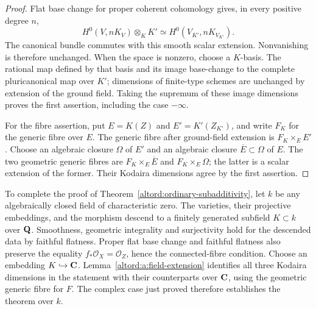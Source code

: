\begin{proof}
Flat base change for proper coherent cohomology gives, in every
positive degree $n$,
\[
 H^0(V,nK_V)\otimes_K K'
 \simeq H^0(V_{K'},nK_{V_{K'}}).
\]
The canonical bundle commutes with this smooth scalar extension.
Nonvanishing is therefore unchanged. When the space is nonzero,
choose a $K$-basis. The rational map defined by that basis and its
image base-change to the complete pluricanonical map over $K'$;
dimensions of finite-type schemes are unchanged by extension of
the ground field. Taking the supremum of these image dimensions
proves the first assertion, including the case $-\infty$.

For the fibre assertion, put \(E=K(Z)\) and
\(E'=K'(Z_{K'})\), and write \(F_K\) for the generic fibre over \(E\).
The generic fibre after ground-field extension is \(F_K\times_E E'\).
Choose an algebraic closure \(\Omega\) of \(E'\) and an algebraic
closure \(\overline E\subset\Omega\) of \(E\). The two geometric
generic fibres are \(F_K\times_E\overline E\) and
\(F_K\times_E\Omega\); the latter is a scalar extension of the
former. Their Kodaira dimensions agree by the first assertion.
\end{proof}

To complete the proof of Theorem~\ref{altord:ordinary-subadditivity}, let \(k\) be any
algebraically closed field of characteristic zero.
The varieties, their projective embeddings, and the morphism
descend to a finitely generated subfield \(K\subset k\) over
\(\mathbf Q\).  Smoothness, geometric integrality and surjectivity hold
for the descended data by faithful flatness.  Proper flat base
change and faithful flatness also preserve the equality
\(f_*\mathcal O_X=\mathcal O_Z\), hence the connected-fibre
condition.  Choose an embedding \(K\hookrightarrow\mathbf C\).
Lemma~\ref{altord:a:field-extension} identifies all three Kodaira
dimensions in the statement with their counterparts over
\(\mathbf C\), using the geometric generic fibre for \(F\).
The complex case just proved therefore establishes the theorem
over \(k\).
